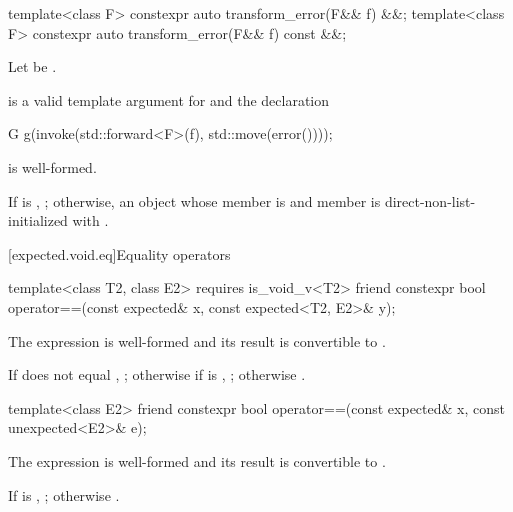 %
\begin{itemdecl}
template<class F> constexpr auto transform_error(F&& f) &&;
template<class F> constexpr auto transform_error(F&& f) const &&;
\end{itemdecl}

\begin{itemdescr}
\pnum
Let  be
.

\pnum
\mandates
{} is a valid template argument
for  and the declaration
\begin{codeblock}
G g(invoke(std::forward<F>(f), std::move(error())));
\end{codeblock}
is well-formed.

\pnum
\returns
If  is , ; otherwise, an
 object whose  member is 
and  member is direct-non-list-initialized with
.
\end{itemdescr}

[expected.void.eq]{Equality operators}

%
\begin{itemdecl}
template<class T2, class E2> requires is_void_v<T2>
  friend constexpr bool operator==(const expected& x, const expected<T2, E2>& y);
\end{itemdecl}

\begin{itemdescr}
\pnum
\constraints
The expression  is well-formed and
its result is convertible to .

\pnum
\returns
If  does not equal , ;
otherwise if  is , ;
otherwise .
\end{itemdescr}

%
\begin{itemdecl}
template<class E2>
  friend constexpr bool operator==(const expected& x, const unexpected<E2>& e);
\end{itemdecl}

\begin{itemdescr}
\pnum
\constraints
The expression  is well-formed and
its result is convertible to .

\pnum
\returns
If  is ,
;
otherwise .
\end{itemdescr}

